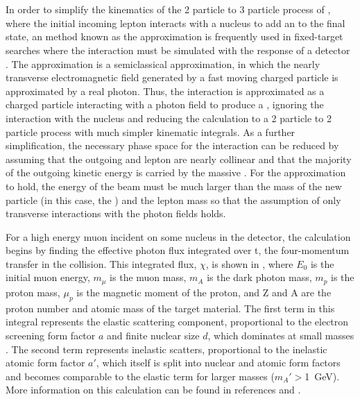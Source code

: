 \section{\ww}
\label{sec:wwApprox}
In order to simplify the kinematics of the 2 particle to 3 particle process of \dbrem, where the initial incoming lepton interacts with a nucleus to add an \aprime to the final state, an method known as the \ww approximation \cite{vonWeizsacker:1934nji,Williams:1935dka} is frequently used in fixed-target searches where the interaction must be simulated with the response of a detector \cite{Bjorken_2009,Andreas_2012}.
The \ww approximation is a semiclassical approximation, in which the nearly transverse electromagnetic field generated by a fast moving charged particle is approximated by a real photon. 
Thus, the interaction is approximated as a charged particle interacting with a photon field to produce a \aprime, ignoring the interaction with the nucleus and reducing the calculation to a 2 particle to 2 particle process with much simpler kinematic integrals.
As a further simplification, the necessary phase space for the interaction can be reduced by assuming that the outgoing \aprime and lepton are nearly collinear and that the majority of the outgoing kinetic energy is carried by the massive \aprime.
For the approximation to hold, the energy of the beam must be much larger than the mass of the new particle (in this case, the \aprime) and the lepton mass so that the assumption of only transverse interactions with the photon fields holds. 

For a high energy muon incident on some nucleus in the detector, the calculation begins by finding the effective photon flux integrated over t, the four-momentum transfer in the collision. 
This integrated flux, $\chi$, is shown in , where $E_0$ is the initial muon energy, $m_\mu$ is the muon mass, $m_A$ is the dark photon mass, $m_p$ is the proton mass, $\mu_p$ is the magnetic moment of the proton, and Z and A are the proton number and atomic mass of the target material.
The first term in this integral represents the  elastic scattering component, proportional to the electron screening form factor $a$ and finite nuclear size $d$, which dominates at small \aprime masses .
The second term represents inelastic scatters, proportional to the inelastic atomic form factor $a'$, which itself is split into nuclear and atomic form factors and becomes comparable to the elastic term for larger \aprime masses ($m_A'>$\SI{1}{\giga\eV}).
More information on this calculation can be found in references \cite{ref:kim_1973} and \cite{ref:tsai_1974}. 

